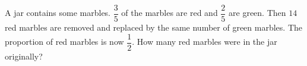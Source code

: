 A jar contains some marbles. $\dfrac{3}{5}$ of the marbles are red and $\dfrac{2}{5}$ are green. Then $14$ red marbles are removed and replaced by the same number of green marbles. The proportion of red marbles is now $\dfrac{1}{2}$. How many red marbles were in the jar originally?
